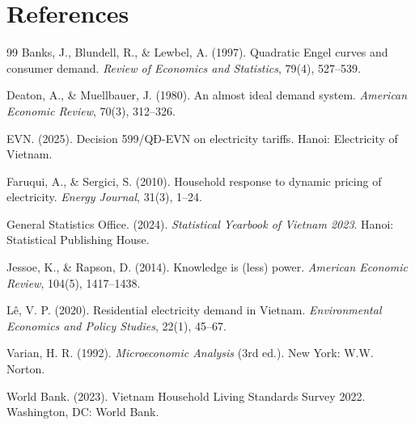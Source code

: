 \documentclass[12pt,a4paper]{article}
\begin{document}
	\section*{References}
	
	\begin{thebibliography}{99}
		 Banks, J., Blundell, R., \& Lewbel, A. (1997). Quadratic Engel curves and consumer demand. \emph{Review of Economics and Statistics}, 79(4), 527--539.
		
		 Deaton, A., \& Muellbauer, J. (1980). An almost ideal demand system. \emph{American Economic Review}, 70(3), 312--326.
		
		 EVN. (2025). Decision 599/QĐ-EVN on electricity tariffs. Hanoi: Electricity of Vietnam.
		
		 Faruqui, A., \& Sergici, S. (2010). Household response to dynamic pricing of electricity. \emph{Energy Journal}, 31(3), 1--24.
		
		 General Statistics Office. (2024). \emph{Statistical Yearbook of Vietnam 2023}. Hanoi: Statistical Publishing House.
		
		 Jessoe, K., \& Rapson, D. (2014). Knowledge is (less) power. \emph{American Economic Review}, 104(5), 1417--1438.
		
		 Lê, V. P. (2020). Residential electricity demand in Vietnam. \emph{Environmental Economics and Policy Studies}, 22(1), 45--67.
		
		 Varian, H. R. (1992). \emph{Microeconomic Analysis} (3rd ed.). New York: W.W. Norton.
		
		 World Bank. (2023). Vietnam Household Living Standards Survey 2022. Washington, DC: World Bank.
	\end{thebibliography}
	
\end{document}

